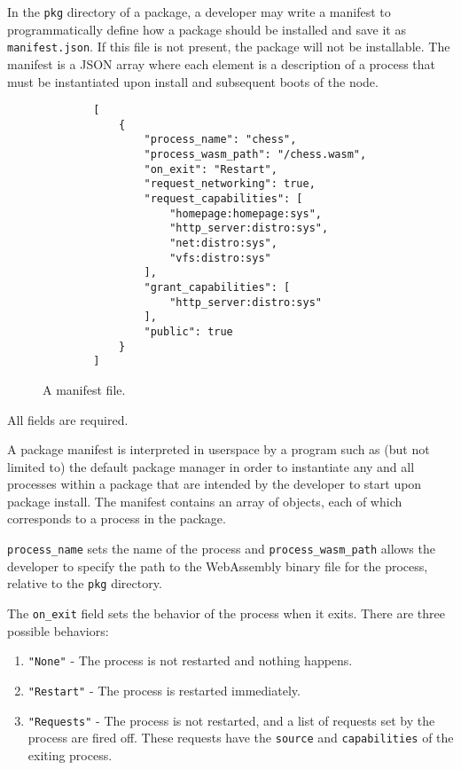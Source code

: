 \documentclass[runningheads]{llncs}
\begin{document}
In the \verb|pkg| directory of a package, a developer may write a manifest to programmatically define how a package should be installed and save it as \verb|manifest.json|.
If this file is not present, the package will not be installable.
The manifest is a JSON array where each element is a description of a process that must be instantiated upon install and subsequent boots of the node.

\begin{figure}[H]
    \centering
    \begin{verbatim}
        [
            {
                "process_name": "chess",
                "process_wasm_path": "/chess.wasm",
                "on_exit": "Restart",
                "request_networking": true,
                "request_capabilities": [
                    "homepage:homepage:sys",
                    "http_server:distro:sys",
                    "net:distro:sys",
                    "vfs:distro:sys"
                ],
                "grant_capabilities": [
                    "http_server:distro:sys"
                ],
                "public": true
            }
        ]
    \end{verbatim}
    \caption{A manifest file.}
    \label{fig:example manifest.json}
\end{figure}

All fields are required.

A package manifest is interpreted in userspace by a program such as (but not limited to) the default package manager in order to instantiate any and all processes within a package that are intended by the developer to start upon package install.
The manifest contains an array of objects, each of which corresponds to a process in the package.

\verb|process_name| sets the name of the process and \verb|process_wasm_path| allows the developer to specify the path to the WebAssembly binary file for the process, relative to the \verb|pkg| directory.

The \verb|on_exit| field sets the behavior of the process when it exits. There are three possible behaviors:
\begin{enumerate}
    \item \verb|"None"| - The process is not restarted and nothing happens.
	\item \verb|"Restart"| - The process is restarted immediately.
	\item \verb|"Requests"| - The process is not restarted, and a list of requests set by the process are fired off. These requests have the \verb|source| and \verb|capabilities| of the exiting process.
\end{enumerate}
\end{document}
